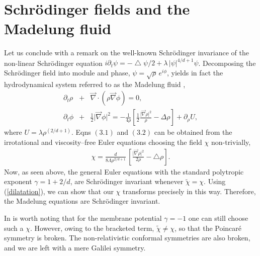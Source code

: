 \documentclass[11pt,a4paper]{article}
\let\ssection=\section
\renewcommand{\section}{\setcounter{equation}{0}\ssection}
\begin{document}
\section{Schr\"odinger fields and the Madelung fluid}

Let us conclude with a remark on the  well-known
Schr\"odinger invariance
of the non-linear Schr\"odinger equation
$i\partial_{t}\psi=-\bigtriangleup\psi/2+\lambda\,\vert\psi\vert^{4/d+1}\psi$.
Decomposing the Schr\"odinger field
into module and phase, $\psi=\sqrt{\rho}\,e^{i\phi}$, yields in fact
the hydrodynamical system referred to as the Madelung
fluid \cite{MAD},
\begin{eqnarray}
\partial_t\rho &+ &\vec{\nabla}\cdot(\rho\vec{\nabla}\phi)=0,
\\
\partial_t\phi&+&\frac{1}{2}\vert\vec{\nabla}\phi\vert^2
=-\frac{1}{4\rho}\left[\frac{1}{2}
\frac{\vert\vec{\nabla}\rho\vert^2}{\rho}
-{\Delta\rho}\right]
+\partial_{\rho}U,
\label{madelungequations}
\end{eqnarray}
where $U=\lambda\rho^{(2/d+1)}$.
Eqns $(3.1)$ and $(3.2)$ can be obtained from the
irrotational and viscosity--free Euler equations
choosing the field $\chi$ non-trivially,
\begin{eqnarray}
\chi=\frac{d}{8{\Lambda}\rho^{2/d+1}}\,\left[
\frac{\vert{\vec\nabla}\rho\vert^2}{2\rho}
-\bigtriangleup\rho\right].
\label{chirelation}
\end{eqnarray}
Now, as seen above, the general Euler equations with the standard
polytropic exponent
$\gamma=1+2/d$,
 are
Schr\"{o}dinger invariant whenever $\tilde{\chi}=\chi$.
Using (\ref{dilatation}),
we can show that our $\chi$ transforms precisely in this way.
Therefore, the Madelung equations
 are Schr\"{o}dinger invariant.

In is worth noting that for the membrane potential $\gamma=-1$
one can still choose such a $\chi$. However, owing to the bracketed
term, $\widetilde{\chi}\neq\chi$, so that  the Poincar\'e symmetry is
broken.
The non-relativistic conformal symmetries are also broken, and
we are left with a mere Galilei symmetry.
\end{document}
